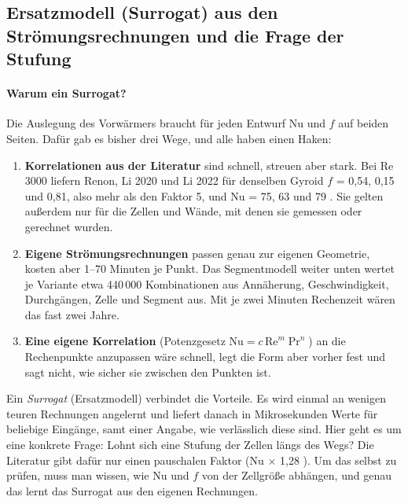 \subsection{Ersatzmodell (Surrogat) aus den Strömungsrechnungen und die Frage der Stufung}\label{sec:tauschersurrogat}

\paragraph{Warum ein Surrogat?} Die Auslegung des Vorwärmers braucht für jeden Entwurf Nu und $f$ auf beiden
Seiten. Dafür gab es bisher drei Wege, und alle haben einen Haken:
\begin{enumerate}
\item \textbf{Korrelationen aus der Literatur} sind schnell, streuen aber stark. Bei Re 3000 liefern Renon, Li 2020
  und Li 2022 für denselben Gyroid $f$ = 0,54, 0,15 und 0,81, also mehr als den Faktor 5, und Nu = 75, 63 und 79
  \cite{renon2024,alsafadi2026}. Sie gelten außerdem nur für die Zellen und Wände, mit denen sie gemessen oder
  gerechnet wurden.
\item \textbf{Eigene Strömungsrechnungen} passen genau zur eigenen Geometrie, kosten aber 1--70 Minuten je Punkt.
  Das Segmentmodell weiter unten wertet je Variante etwa 440\,000 Kombinationen aus Annäherung, Geschwindigkeit,
  Durchgängen, Zelle und Segment aus. Mit je zwei Minuten Rechenzeit wären das fast zwei Jahre.
\item \textbf{Eine eigene Korrelation} (Potenzgesetz $\mathrm{Nu} = c\,\mathrm{Re}^m\Pr^n$) an die Rechenpunkte
  anzupassen wäre schnell, legt die Form aber vorher fest und sagt nicht, wie sicher sie zwischen den Punkten ist.
\end{enumerate}
Ein \emph{Surrogat} (Ersatzmodell) verbindet die Vorteile. Es wird einmal an wenigen teuren Rechnungen angelernt und
liefert danach in Mikrosekunden Werte für beliebige Eingänge, samt einer Angabe, wie verlässlich diese sind. Hier
geht es um eine konkrete Frage: Lohnt sich eine Stufung der Zellen längs des Wegs? Die Literatur gibt dafür nur einen
pauschalen Faktor (Nu $\times$ 1,28 \cite{oh2025}). Um das selbst zu prüfen, muss man wissen, wie Nu und $f$ von der
Zellgröße abhängen, und genau das lernt das Surrogat aus den eigenen Rechnungen.

